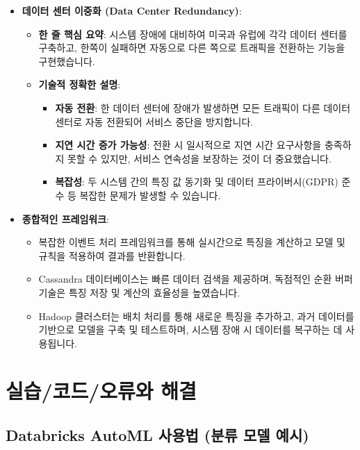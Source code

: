 \documentclass[11pt,a4paper]{article}
\begin{document}
\begin{itemize}
\begin{itemize}
\begin{itemize}
\begin{itemize}
\begin{itemize}
\begin{itemize}
    \item \textbf{데이터 센터 이중화 (Data Center Redundancy)}:
    \begin{itemize}
        \item \textbf{한 줄 핵심 요약}: 시스템 장애에 대비하여 미국과 유럽에 각각 데이터 센터를 구축하고, 한쪽이 실패하면 자동으로 다른 쪽으로 트래픽을 전환하는 기능을 구현했습니다.
        \item \textbf{기술적 정확한 설명}:
        \begin{itemize}
            \item \textbf{자동 전환}: 한 데이터 센터에 장애가 발생하면 모든 트래픽이 다른 데이터 센터로 자동 전환되어 서비스 중단을 방지합니다.
            \item \textbf{지연 시간 증가 가능성}: 전환 시 일시적으로 지연 시간 요구사항을 충족하지 못할 수 있지만, 서비스 연속성을 보장하는 것이 더 중요했습니다.
            \item \textbf{복잡성}: 두 시스템 간의 특징 값 동기화 및 데이터 프라이버시(GDPR) 준수 등 복잡한 문제가 발생할 수 있습니다.
        \end{itemize}
    \end{itemize}
    \item \textbf{종합적인 프레임워크}:
    \begin{itemize}
        \item 복잡한 이벤트 처리 프레임워크를 통해 실시간으로 특징을 계산하고 모델 및 규칙을 적용하여 결과를 반환합니다.
        \item Cassandra 데이터베이스는 빠른 데이터 검색을 제공하며, 독점적인 순환 버퍼 기술은 특징 저장 및 계산의 효율성을 높였습니다.
        \item Hadoop 클러스터는 배치 처리를 통해 새로운 특징을 추가하고, 과거 데이터를 기반으로 모델을 구축 및 테스트하며, 시스템 장애 시 데이터를 복구하는 데 사용됩니다.
    \end{itemize}
\end{itemize}

\newpage
\section*{실습/코드/오류와 해결}

\subsection*{Databricks AutoML 사용법 (분류 모델 예시)}


\end{itemize}
\end{itemize}
\end{itemize}
\end{itemize}
\end{itemize}
\end{document}
